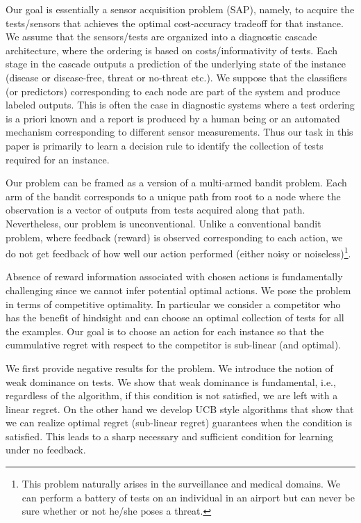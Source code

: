 \documentclass{article}
\begin{document}
Our goal is essentially a sensor acquisition problem (SAP), namely, to acquire the tests/sensors that achieves the optimal cost-accuracy tradeoff for that instance. We assume that the sensors/tests are organized into a diagnostic cascade architecture, where the ordering is based on costs/informativity of tests. Each stage in the cascade outputs a prediction of the underlying state of the instance (disease or disease-free, threat or no-threat etc.). We suppose that the classifiers (or predictors) corresponding to each node are part of the system and produce labeled outputs. This is often the case in diagnostic systems where a test ordering is a priori known and a report is produced by a human being or an automated mechanism corresponding to different sensor measurements. Thus our task in this paper is primarily to learn a decision rule to identify the collection of tests required for an instance. 

Our problem can be framed as a version of a multi-armed bandit problem. Each arm of the bandit corresponds to a unique path from root to a node where the observation is a vector of outputs from tests acquired along that path. Nevertheless, our problem is unconventional. Unlike a conventional bandit problem, where feedback (reward) is observed corresponding to each action, we do not get feedback of how well our action performed (either noisy or noiseless)\footnote{This problem naturally arises in the surveillance and medical domains. We can perform a battery of tests on an individual in an airport but can never be sure whether or not he/she poses a threat.}.

Absence of reward information associated with chosen actions is fundamentally challenging since we cannot infer potential optimal actions. We pose the problem in terms of competitive optimality. In particular we consider a competitor who has the benefit of hindsight and can choose an optimal collection of tests for all the examples. Our goal is to choose an action for each instance so that the cummulative regret with respect to the competitor is sub-linear (and optimal). 

We first provide negative results for the problem. We introduce the notion of weak dominance on tests. We show that weak dominance is fundamental, i.e., regardless of the algorithm, if this condition is not satisfied, we are left with a linear regret. On the other hand we develop UCB style algorithms that show that we can realize optimal regret (sub-linear regret) guarantees when the condition is satisfied. This leads to a sharp necessary and sufficient condition for learning under no feedback. 
\end{document}
